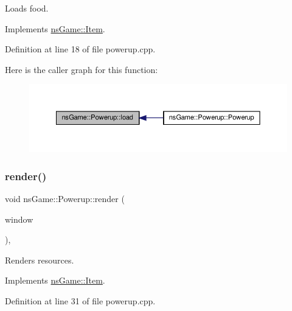 Loads food. 



Implements \hyperlink{structns_game_1_1_item_a5887b6e9225ae8a276801225eca83808}{ns\+Game\+::\+Item}.



Definition at line 18 of file powerup.\+cpp.

Here is the caller graph for this function\+:\nopagebreak
\begin{figure}[H]
\begin{center}
\leavevmode
\includegraphics[width=350pt]{classns_game_1_1_powerup_a2a228e8f89bed454ad8011dfd88068c6_icgraph}
\end{center}
\end{figure}
\mbox{\label{classns_game_1_1_powerup_ad113cfd795157168c103b71560180201}} 
\subsubsection{\texorpdfstring{render()}{render()}}
{\footnotesize\ttfamily void ns\+Game\+::\+Powerup\+::render (\begin{DoxyParamCaption}\item[{Min\+GL \&}]{window }\end{DoxyParamCaption})\hspace{0.3cm}{\ttfamily [override]}, {\ttfamily [virtual]}}



Renders resources. 



Implements \hyperlink{structns_game_1_1_item_a451b6491efc475c9ca47dcccdbbde707}{ns\+Game\+::\+Item}.



Definition at line 31 of file powerup.\+cpp.

